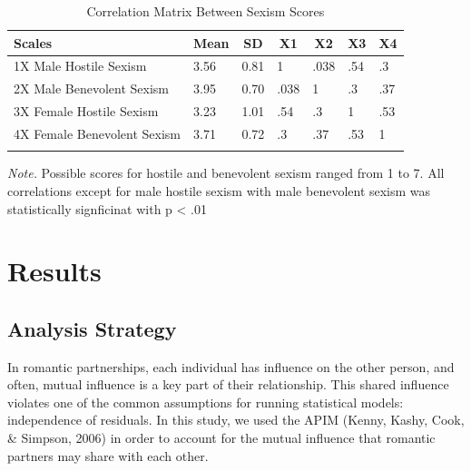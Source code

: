 \documentclass[
  man]{apa6}
\begin{document}
\begin{table}[tbp]

\begin{center}
\begin{threeparttable}

\caption{\label{tab:unnamed-chunk-2}Correlation Matrix Between Sexism Scores}

\begin{tabular}{lllllll}
\toprule
Scales & \multicolumn{1}{c}{Mean} & \multicolumn{1}{c}{SD} & \multicolumn{1}{c}{X1} & \multicolumn{1}{c}{X2} & \multicolumn{1}{c}{X3} & \multicolumn{1}{c}{X4}\\
\midrule
1X Male Hostile Sexism & 3.56 & 0.81 & 1 & .038 & .54 & .3\\
2X Male Benevolent Sexism & 3.95 & 0.70 & .038 & 1 & .3 & .37\\
3X Female Hostile Sexism & 3.23 & 1.01 & .54 & .3 & 1 & .53\\
4X Female Benevolent Sexism & 3.71 & 0.72 & .3 & .37 & .53 & 1\\
\bottomrule
\addlinespace
\end{tabular}

\begin{tablenotes}[para]
\normalsize{\textit{Note.} Possible scores for hostile and benevolent sexism ranged from 1 to 7. All correlations except for male hostile sexism with male benevolent sexism was statistically signficinat with p < .01}
\end{tablenotes}

\end{threeparttable}
\end{center}

\end{table}

\hypertarget{results}{%
\section{Results}\label{results}}

\hypertarget{analysis-strategy}{%
\subsection{Analysis Strategy}\label{analysis-strategy}}

In romantic partnerships, each individual has influence on the other person, and often, mutual influence is a key part of their relationship. This shared influence violates one of the common assumptions for running statistical models: independence of residuals. In this study, we used the APIM (Kenny, Kashy, Cook, \& Simpson, 2006) in order to account for the mutual influence that romantic partners may share with each other.
\end{document}
